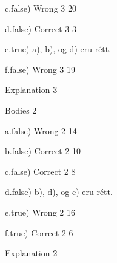 c.false) Wrong 3 20

d.false) Correct 3 3

e.true) a), b), og d) eru rétt.

f.false) Wrong 3 19

Explanation 3


Bodies 2

a.false) Wrong 2 14

b.false) Correct 2 10

c.false) Correct 2 8

d.false) b), d), og e) eru rétt.

e.true) Wrong 2 16

f.true) Correct 2 6

Explanation 2

